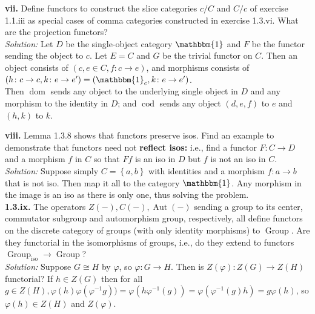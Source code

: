 \documentclass[a4paper]{article}
\theoremstyle{plain}%
\theoremstyle{definition}
\theoremstyle{remark}
\DeclareMathOperator{\Group}{Group}
\DeclareMathOperator{\dom}{dom}
\DeclareMathOperator{\cod}{cod}
\DeclareMathOperator{\Aut}{Aut}
\begin{document}
\textbf{vii.} Define functors to construct the slice categories $c /C$ and
$C /c$ of exercise 1.1.iii as special cases of comma categories constructed in
exercise 1.3.vi. What are the projection functors?\\
\linebreak
\textit{Solution:} Let $D$ be the single-object category $\mathbbm{1}$ and
$F$ be the functor sending the object to $c$.
Let $E = C$ and $G$ be the trivial functor on $C$. Then
an object consists of
$\left( c, e \in C, f  \colon c \to e \right) $, and morphisms consists
of $\left( h  \colon c \to c, k  \colon e \to e' \right) 
= \left( \mathbbm{1}_c , k  \colon e \to e' \right) $.\\
Then $\dom$ sends any object to the underlying single object in $D$ and
any morphism to the identity in $D$; and $\cod$ sends any object
$\left( d, e,f \right) $ to $e$ and
$\left( h, k \right) $ to $k$.\\
\linebreak

\textbf{viii.} Lemma 1.3.8 shows that functors preserve isos. Find an example
to demonstrate that functors need not \textbf{reflect isos:} i.e., find
a functor
$F  \colon C \to D$ and a morphism $f$ in $C$ so that $F f$ is an iso in $D$
but
$f$ is not an iso in $C$.\\
\linebreak
\textit{Solution:} Suppose simply
$C = \left\{ a,b \right\} $ with identities and
a morphism $f  \colon a \to b$ that is not iso. Then map
it all to the category $\mathbbm{1}$. Any morphism in the image is an iso as
there is only one, thus solving the problem.\\
\linebreak
\textbf{1.3.ix.} The operators $Z(-), C(-), \Aut(-)$ sending a group to its
center, commutator subgroup and automorphism group, respectively, all define
functors on the discrete category of groups (with only identity morphisms) to
$\Group$. Are they functorial in the isomorphisms of groups, i.e., do they
extend to functors $\Group_{\text{iso}} \to \Group$?\\
\textit{Solution:} Suppose $G \cong H$ by $\varphi$, so
$\varphi  \colon G \to H$. Then is
$Z(\varphi)  \colon Z(G) \to Z(H)$ functorial? 
If $h \in Z(G)$ then for all
$g \in Z(H), \varphi(h) \varphi(\varphi^{-1}g)) =
\varphi \left( h \varphi^{-1}(g) \right) 
= \varphi \left( \varphi^{-1}(g) h \right) 
= g \varphi(h)$, so $\varphi(h) \in Z(H)$ and
$Z(\varphi) $.\\
\linebreak
\end{document}
